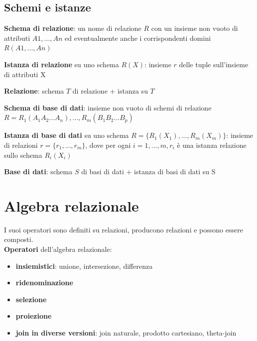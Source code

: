 \subsection{Schemi e istanze}
\colorbox{SALZO}{\parbox{\dimexpr\linewidth-2\fboxsep}{\begin{definition}
   \textbf{Schema di relazione}: un nome di relazione $R$ con un insieme non vuoto di attributi $A1,...,An$ ed eventualmente anche i corrispondenti domini $R(A1,...,An)$
\end{definition}}}
\colorbox{SALZO}{\parbox{\dimexpr\linewidth-2\fboxsep}{\begin{definition}
   \textbf{Istanza di relazione} su uno schema $R(X)$: insieme $r$ delle tuple sull'insieme di attributi X   
\end{definition}}}
\colorbox{SALZO}{\parbox{\dimexpr\linewidth-2\fboxsep}{\begin{definition}
   \textbf{Relazione}: schema $T$ di relazione $+$ istanza su $T$
\end{definition}}}
\colorbox{SALZO}{\parbox{\dimexpr\linewidth-2\fboxsep}{\begin{definition}
   \textbf{Schema di base di dati}: insieme non vuoto di schemi di relazione $R={R_1 (A_1 A_2 ... A_n),..., R_m (B_1 B_2 ... B_p) }$
\end{definition}}}
\colorbox{SALZO}{\parbox{\dimexpr\linewidth-2\fboxsep}{\begin{definition}
   \textbf{Istanza di base di dati} su uno schema $R=\{ R_1(X_1),...,R_m(X_m)\}$: insieme di relazioni $r=\{ r_1,...,r_m\}$, dove per ogni $i=1,...,m, r_i $ è una istanza relazione sullo schema $R_i(X_i)$
\end{definition}}}
\colorbox{SALZO}{\parbox{\dimexpr\linewidth-2\fboxsep}{\begin{definition}
   \textbf{Base di dati}: schema $S$ di basi di dati $+$ istanza di basi di dati su S
\end{definition}}}

\section{Algebra relazionale}
I suoi operatori sono definiti su relazioni, producono relazioni e possono essere composti.\\
\textbf{Operatori} dell'algebra relazionale:
\begin{itemize}
    \item \textbf{insiemistici}: unione, intersezione, differenza
    \item \textbf{ridenominazione}
    \item \textbf{selezione}
    \item \textbf{proiezione}
    \item \textbf{join in diverse versioni}: join naturale, prodotto cartesiano, theta-join
\end{itemize}
